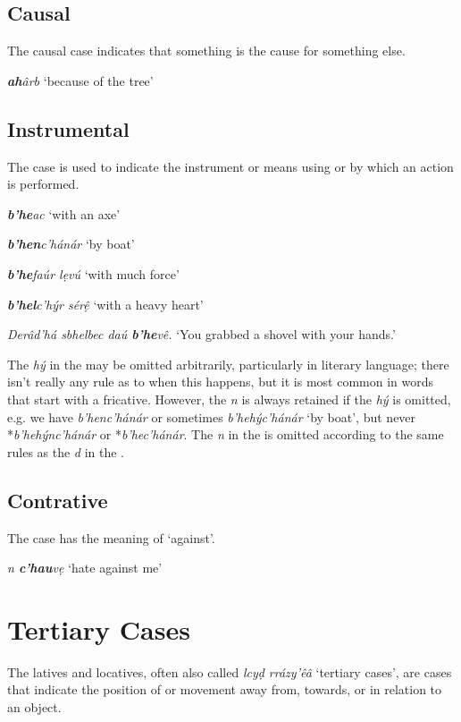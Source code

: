 \documentclass[a4paper, 12pt, twoside, openright, final]{book}
\def \b {ḅ}
\let \w \textit
\let \b \textbf
\begin{document}
\subsection{Causal}
The causal case indicates that something is the cause for something else.
\begin{examples}
    \item \w{\b{ah}ârb} ‘because of the tree’
\end{examples}

\subsection{Instrumental}
The  case is used to indicate the instrument or means using or by which an action is performed.
\begin{examples}
    \item \w{\b{b’he}ac} ‘with an axe’
    \item \w{\b{b’hen}c’hánár} ‘by boat’
    \item \w{\b{b’he}faúr lẹvú} ‘with much force’
    \item \w{\b{b’hel}c’hýr sérệ} ‘with a heavy heart’
    \item \w{Derâd’há sbhelbec daú \b{b’he}vê.} ‘You grabbed a shovel with your hands.’
\end{examples}

The \w{hý} in the  may be omitted arbitrarily, particularly in literary language; there
isn’t really any rule as to when this happens, but it is most common in words that start with a fricative. However, the \w{n}
is always retained if the \w{hý} is omitted, e.g. we have \w{b’henc’hánár} or sometimes \w{b’hehýc’hánár} ‘by boat’, but never
*\w{b’hehýnc’hánár} or *\w{b’hec’hánár}. The \w{n} in the  is omitted according to the same rules
as the \w{d} in the .

\subsection{Contrative}
The  case has the meaning of ‘against’.
\begin{examples}
    \item \w{n \b{c’hau}vẹ} ‘hate against me’
\end{examples}


\section{Tertiary Cases}
The latives and locatives, often also called \w{lcyḍ rrázy’êâ} ‘tertiary cases’, are cases that indicate the position of
or movement away from, towards, or in relation to an object.
\end{document}
